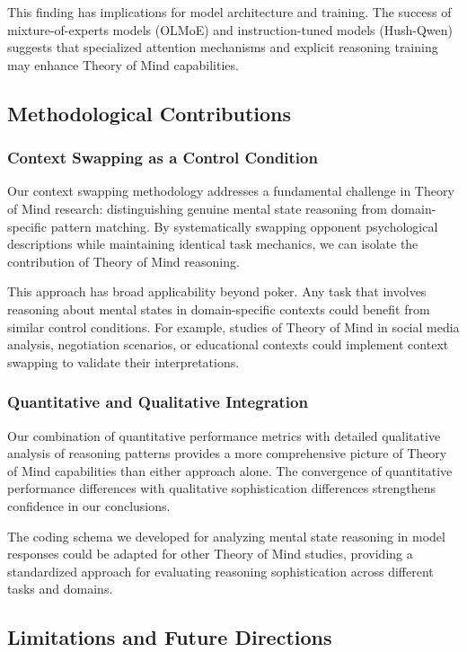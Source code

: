 This finding has implications for model architecture and training. The success of mixture-of-experts models (OLMoE) and instruction-tuned models (Hush-Qwen) suggests that specialized attention mechanisms and explicit reasoning training may enhance Theory of Mind capabilities.

\subsection{Methodological Contributions}
\label{subsec:methodological_contributions}

\subsubsection{Context Swapping as a Control Condition}

Our context swapping methodology addresses a fundamental challenge in Theory of Mind research: distinguishing genuine mental state reasoning from domain-specific pattern matching. By systematically swapping opponent psychological descriptions while maintaining identical task mechanics, we can isolate the contribution of Theory of Mind reasoning.

This approach has broad applicability beyond poker. Any task that involves reasoning about mental states in domain-specific contexts could benefit from similar control conditions. For example, studies of Theory of Mind in social media analysis, negotiation scenarios, or educational contexts could implement context swapping to validate their interpretations.

\subsubsection{Quantitative and Qualitative Integration}

Our combination of quantitative performance metrics with detailed qualitative analysis of reasoning patterns provides a more comprehensive picture of Theory of Mind capabilities than either approach alone. The convergence of quantitative performance differences with qualitative sophistication differences strengthens confidence in our conclusions.

The coding schema we developed for analyzing mental state reasoning in model responses could be adapted for other Theory of Mind studies, providing a standardized approach for evaluating reasoning sophistication across different tasks and domains.

\subsection{Limitations and Future Directions}
\label{subsec:limitations}

